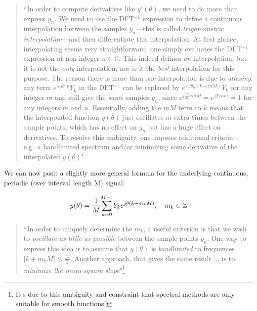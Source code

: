 \documentclass[10pt]{article}
\begin{document}
\begin{quotation}\label{bandlimited}
``In order to compute derivatives like $y'(\theta)$, we need to do more than express $y_n$. We need to use the DFT$^{-1}$ expression to define a continuous interpolation between the samples $y_n$---this is called \textit{trigonometric interpolation}---and then differentiate this interpolation. At first glance, interpolating seems very straightforward: one simply evaluates the DFT$^{-1}$ expression at non-integer $n \in \mathbb{R}$. This indeed defines \textit{an} interpolation, but it is not the \textit{only} interpolation, nor is it the \textit{best} interpolation for this purpose. The reason there is more than one interpolation is due to \textit{aliasing}: any term $e^{+j \theta_n k} Y_k$ in the DFT$^{-1}$ can be replaced by $e^{+j \theta_n (k + mM)} Y_k$ for any integer $m$ and still give the \textit{same} samples $y_n$, since $e^{j \frac{2\pi}{M} nmM} = e^{j2\pi nm} = 1$ for any integers $m$ and $n$. Essentially, adding the $mM$ term to $k$ means that the interpolated function $y(\theta)$ just oscillates $m$ extra times between the sample points, which has no effect on $y_n$ but has a huge effect on derivatives. To resolve this ambiguity, one imposes additional criteria---e.g.~a bandlimited spectrum and/or minimizing some derivative of the interpolated $y(\theta)$"
\end{quotation}

We can now posit a slightly more general formula for the underlying continuous, periodic (over interval length M) signal:\vspace{-2mm}

$$ y(\theta) = \frac{1}{M} \sum_{k=0}^{\mathclap{M-1}} Y_k e^{j \theta (k + m_k M)}, \quad m_k \in \mathbb{Z} $$

\begin{quotation}
``In order to uniquely determine the $m_k$, a useful criterion is that we wish to \textit{oscillate as little as possible} between the sample points $y_n$. One way to express this idea is to assume that $y(\theta)$ is \textit{bandlimited} to frequences $|k + m_k M| \leq \frac{M}{2}$. Another approach, that gives the same result ... is to \textit{minimize the mean-square slope}"\footnote{It's due to this ambiguity and constraint that spectral methods are only suitable for smooth functions!}
\end{quotation}\vspace{-7mm}
\end{document}
